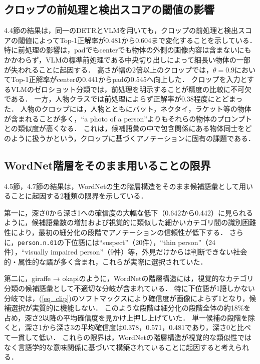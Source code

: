 \subsection{クロップの前処理と検出スコアの閾値の影響}
4.4節の結果は，同一のDETRとVLMを用いても，クロップの前処理と検出スコアの閾値によってTop-1正解率が0.481から0.604まで変化することを示している．
特に前処理の影響は，padでもcenterでも物体の外側の画像内容は含まないにもかかわらず，VLMの標準前処理である中央切り出しによって細長い物体の一部が失われることに起因する．
高さが幅の2倍以上のクロップでは，$ \theta = 0.9 $においてTop-1正解率がcenterの0.441からpadの0.545へ向上した．
クロップを入力とするVLMのゼロショット分類では，前処理を明示することが精度の比較に不可欠である．
一方，人物クラスでは前処理によらず正解率が0.38程度にとどまった．
人物のクロップには，人物とともにバット，ネクタイ，ラケット等の物体が含まれることが多く，``a photo of a person''よりもそれらの物体のプロンプトとの類似度が高くなる．
これは，候補語彙の中で包含関係にある物体同士をどのように扱うかという，クロップに基づくアノテーションに固有の課題である．

\subsection{WordNet階層をそのまま用いることの限界}
4.5節，4.7節の結果は，WordNetの生の階層構造をそのまま候補語彙として用いることに起因する2種類の限界を示している．

第一に，深さ0から深さ1への確信度の大幅な低下（0.642から0.442）に見られるように，候補語彙数の増加および視覚的に類似した細かいカテゴリ間の識別困難性により，最初の細分化の段階でアノテーションの信頼性が低下する．
さらに，\texttt{person.n.01}の下位語には``suspect''（20件），``thin person''（24件），``visually impaired person''（9件）等，外見だけからは判断できない社会的・属性的な語が多く含まれ，これらが実際に選択されていた．

第二に，giraffe → okapiのように，WordNetの階層構造には，視覚的なカテゴリ分類の候補語彙として不適切な分岐が含まれている．
特に下位語が1語しかない分岐では，(\ref{eq_clip})のソフトマックスにより確信度が画像によらず1となり，候補選択が実質的に機能しない．
このような段階は細分化の段階全体の約18\%を占め，深さ2以降の平均確信度を見かけ上押し上げていた．
単一候補の段階を除くと，深さ1から深さ3の平均確信度は0.378，0.571，0.481であり，深さ0と比べて一貫して低い．
これらの限界は，WordNetの階層構造が視覚的な類似性ではなく言語学的な意味関係に基づいて構築されていることに起因すると考えられる．

